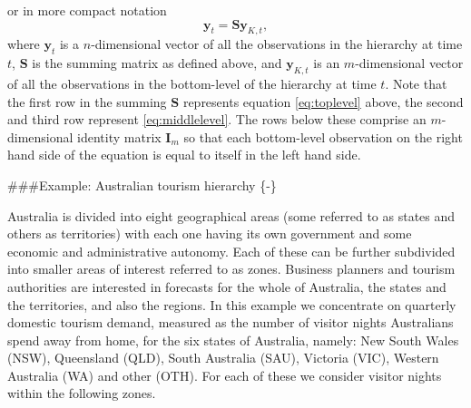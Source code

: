 \documentclass[]{book}
\begin{document}
or in more compact notation
\begin{equation}
  \bm{y}_t=\bm{S}\bm{y}_{K,t},
  \label{eq:smatrix}
\end{equation}
where \(\bm{y}_t\) is a \(n\)-dimensional vector of all the observations in the hierarchy at time \(t\), \(\bm{S}\) is the summing matrix as defined above, and \(\bm{y}_{K,t}\) is an \(m\)-dimensional vector of all the observations in the bottom-level of the hierarchy at time \(t\). Note that the first row in the summing \(\bm{S}\) represents equation \eqref{eq:toplevel} above, the second and third row represent \eqref{eq:middlelevel}. The rows below these comprise an \(m\)-dimensional identity matrix \(\bm{I}_m\) so that each bottom-level observation on the right hand side of the equation is equal to itself in the left hand side.

\#\#\#Example: Australian tourism hierarchy \{-\}

Australia is divided into eight geographical areas (some referred to as states and others as territories) with each one having its own government and some economic and administrative autonomy. Each of these can be further subdivided into smaller areas of interest referred to as zones. Business planners and tourism authorities are interested in forecasts for the whole of Australia, the states and the territories, and also the regions. In this example we concentrate on quarterly domestic tourism demand, measured as the number of visitor nights Australians spend away from home, for the six states of Australia, namely: New South Wales (NSW), Queensland (QLD), South Australia (SAU), Victoria (VIC), Western Australia (WA) and other (OTH). For each of these we consider visitor nights within the following zones.
\end{document}
